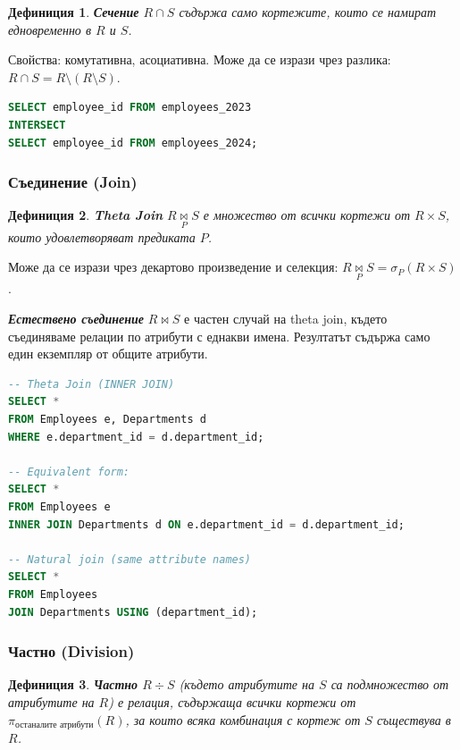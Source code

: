 \documentclass{scrartcl}
\newtheorem{definition}{Дефиниция}
\begin{document}
\begin{FlushLeft}
\begin{definition}
\textbf{\textit{Сечение}} $R \cap S$ съдържа само кортежите, които се намират едновременно в $R$ и $S$.
\end{definition}

Свойства: комутативна, асоциативна. Може да се изрази чрез разлика: $R \cap S = R \setminus (R \setminus S)$.

\begin{lstlisting}[language=SQL, caption=INTERSECT]
SELECT employee_id FROM employees_2023
INTERSECT
SELECT employee_id FROM employees_2024;
\end{lstlisting}

\subsubsection{Съединение (Join)}

\begin{definition}
\textbf{\textit{Theta Join}} $R \underset{P}{\bowtie} S$ е множество от всички кортежи от $R \times S$, които удовлетворяват предиката $P$.
\end{definition}

Може да се изрази чрез декартово произведение и селекция: $R \underset{P}{\bowtie} S = \sigma_P(R \times S)$.

\textbf{\textit{Естествено съединение}} $R \bowtie S$ е частен случай на theta join, където съединяваме релации по атрибути с еднакви имена. Резултатът съдържа само един екземпляр от общите атрибути.

\begin{lstlisting}[language=SQL, caption=JOIN operations]
-- Theta Join (INNER JOIN)
SELECT *
FROM Employees e, Departments d
WHERE e.department_id = d.department_id;

-- Equivalent form:
SELECT *
FROM Employees e
INNER JOIN Departments d ON e.department_id = d.department_id;

-- Natural join (same attribute names)
SELECT *
FROM Employees
JOIN Departments USING (department_id);
\end{lstlisting}

\subsubsection{Частно (Division)}

\begin{definition}
\textbf{\textit{Частно}} $R \div S$ (където атрибутите на $S$ са подмножество от атрибутите на $R$) е релация, съдържаща всички кортежи от $\pi_{\text{останалите атрибути}}(R)$, за които всяка комбинация с кортеж от $S$ съществува в $R$.
\end{definition}


\end{FlushLeft}
\end{document}
